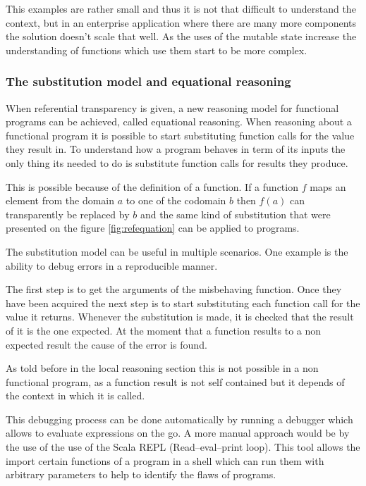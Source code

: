 \documentclass[../main.tex]{subfiles}
\begin{document}


This examples are rather small and thus it is not that difficult to understand
the context, but in an enterprise application where there are many more
components the solution doesn't scale that well. As the uses of the mutable
state increase the understanding of functions which use them start to be more
complex.

\subsubsection{The substitution model and equational reasoning}

When referential transparency is given, a new reasoning model for functional
programs can be achieved, called equational reasoning. When reasoning about a
functional program it is possible to start substituting function calls for the
value they result in. To understand how a program behaves in term of its inputs
the only thing its needed to do is substitute function calls for results they
produce.

This is possible because of the definition of a function. If a function $f$ maps an
element from the domain $a$ to one of the codomain $b$ then $f(a)$ can
transparently be replaced by $b$ and the same kind of substitution that were
presented on the figure \ref{fig:refequation} can be applied to programs.

The substitution model can be useful in multiple scenarios. One example is the
ability to debug errors in a reproducible manner.

The first step is to get the arguments of the misbehaving function. Once they have been acquired the next step is to
start substituting each function call for the value it returns. Whenever the
substitution is made, it is checked that the result of it is the one expected. At the
moment that a function results to a non expected result the cause of the error
is found.

As told before in the local reasoning section this is not possible in a non
functional program, as a function result is not self contained but it depends of
the context in which it is called.

This debugging process can be done automatically by running a debugger which allows to
evaluate expressions on the go. A more manual approach would be by the use of
the use of the Scala REPL (Read–eval–print loop). This tool allows the import
certain functions of a program in a shell which can run them with arbitrary
parameters to help to identify the flaws of programs.
\end{document}
